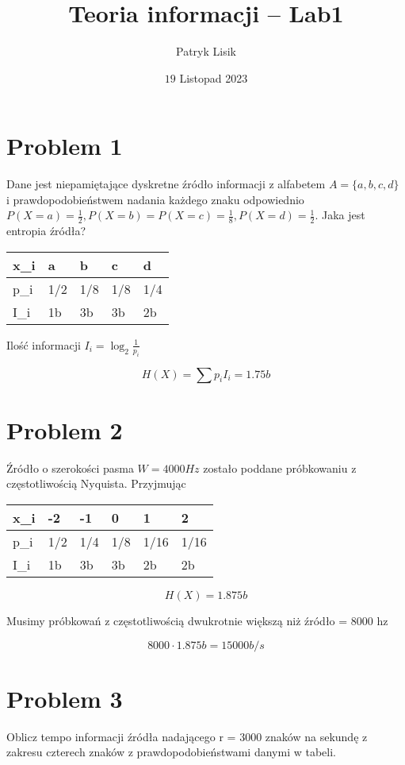 \documentclass[12pt]{article}
\title{Teoria informacji -- Lab1}
\author{Patryk Lisik}
\date{\(19\) Listopad  2023}
\begin{document}
\maketitle


\section*{Problem 1}

Dane jest niepamiętające dyskretne źródło informacji z alfabetem $A = \{a,b,c,d\}$ i prawdopodobieństwem  
nadania każdego znaku odpowiednio $P(X=a)=\frac{1}{2}, P(X=b)=P(X=c)=\frac{1}{8}, P(X=d) = \frac{1}{2}$. 
Jaka jest entropia źródła?

\begin{table}[h]
\begin{tabular}{|l|l|l|l|l|}
\hline
x\_i & a   & b   & c   & d   \\ \hline
p\_i & 1/2 & 1/8 & 1/8 & 1/4 \\ \hline
I\_i & 1b  & 3b  & 3b  & 2b  \\ \hline
\end{tabular}

\end{table}
Ilość informacji $I_i = \log_2\frac{1}{p_i}$

$$H(X) = \sum p_iI_i = 1.75b $$

\section*{Problem 2}
Źródło o szerokości pasma $W = 4000Hz$ zostało poddane próbkowaniu z częstotliwością Nyquista.
Przyjmując 


\begin{table}[h]
\begin{tabular}{|l|l|l|l|l|l|}
\hline
    x\_i & -2   & -1   & 0   & 1 & 2   \\ \hline
    p\_i & 1/2 & 1/4 & 1/8 & 1/16 & 1/16 \\ \hline
    I\_i & 1b  & 3b  & 3b  & 2b & 2b \\ \hline
\end{tabular}

\end{table}

$$H(X) = 1.875b$$

Musimy próbkowań z częstotliwością dwukrotnie większą niż źródło = $8000$ hz

$$8000 \cdot 1.875b = 15000 b/s $$

\section*{Problem 3}
Oblicz tempo informacji źródła nadającego r = 3000 znaków na sekundę z zakresu czterech znaków z prawdopodobieństwami danymi w tabeli.
\end{document}

